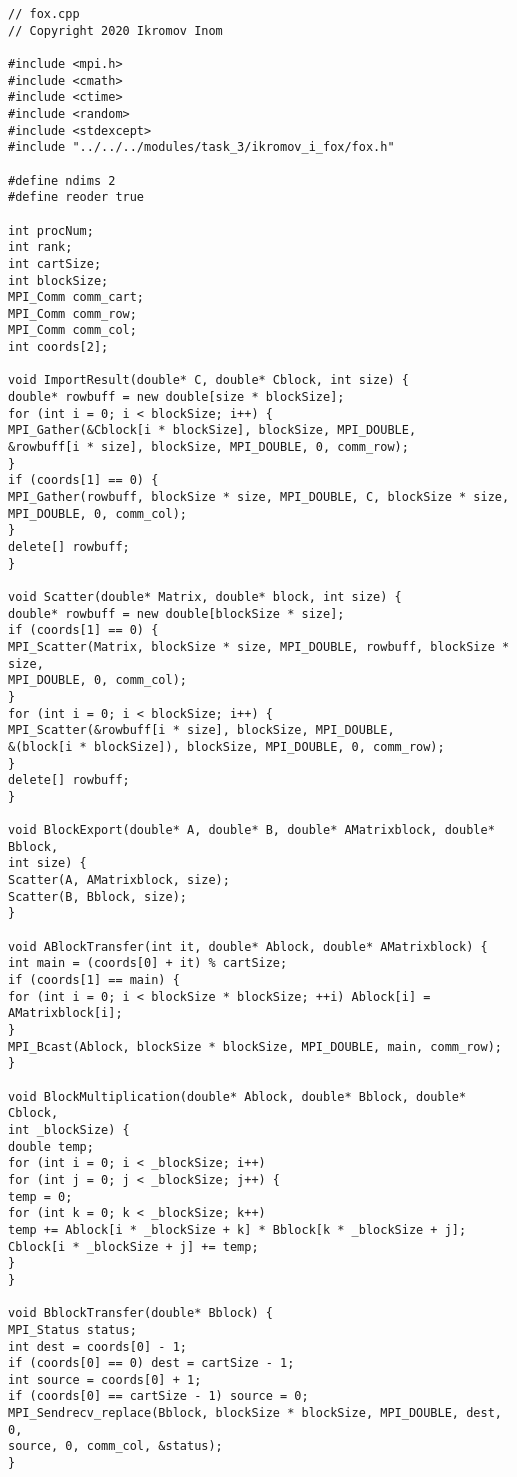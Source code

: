 \documentclass{report}
\begin{document}
\begin{lstlisting}
// fox.cpp
// Copyright 2020 Ikromov Inom

#include <mpi.h>
#include <cmath>
#include <ctime>
#include <random>
#include <stdexcept>
#include "../../../modules/task_3/ikromov_i_fox/fox.h"

#define ndims 2
#define reoder true

int procNum;
int rank;
int cartSize;
int blockSize;
MPI_Comm comm_cart;
MPI_Comm comm_row;
MPI_Comm comm_col;
int coords[2];

void ImportResult(double* C, double* Cblock, int size) {
double* rowbuff = new double[size * blockSize];
for (int i = 0; i < blockSize; i++) {
MPI_Gather(&Cblock[i * blockSize], blockSize, MPI_DOUBLE,
&rowbuff[i * size], blockSize, MPI_DOUBLE, 0, comm_row);
}
if (coords[1] == 0) {
MPI_Gather(rowbuff, blockSize * size, MPI_DOUBLE, C, blockSize * size,
MPI_DOUBLE, 0, comm_col);
}
delete[] rowbuff;
}

void Scatter(double* Matrix, double* block, int size) {
double* rowbuff = new double[blockSize * size];
if (coords[1] == 0) {
MPI_Scatter(Matrix, blockSize * size, MPI_DOUBLE, rowbuff, blockSize * size,
MPI_DOUBLE, 0, comm_col);
}
for (int i = 0; i < blockSize; i++) {
MPI_Scatter(&rowbuff[i * size], blockSize, MPI_DOUBLE,
&(block[i * blockSize]), blockSize, MPI_DOUBLE, 0, comm_row);
}
delete[] rowbuff;
}

void BlockExport(double* A, double* B, double* AMatrixblock, double* Bblock,
int size) {
Scatter(A, AMatrixblock, size);
Scatter(B, Bblock, size);
}

void ABlockTransfer(int it, double* Ablock, double* AMatrixblock) {
int main = (coords[0] + it) % cartSize;
if (coords[1] == main) {
for (int i = 0; i < blockSize * blockSize; ++i) Ablock[i] = AMatrixblock[i];
}
MPI_Bcast(Ablock, blockSize * blockSize, MPI_DOUBLE, main, comm_row);
}

void BlockMultiplication(double* Ablock, double* Bblock, double* Cblock,
int _blockSize) {
double temp;
for (int i = 0; i < _blockSize; i++)
for (int j = 0; j < _blockSize; j++) {
temp = 0;
for (int k = 0; k < _blockSize; k++)
temp += Ablock[i * _blockSize + k] * Bblock[k * _blockSize + j];
Cblock[i * _blockSize + j] += temp;
}
}

void BblockTransfer(double* Bblock) {
MPI_Status status;
int dest = coords[0] - 1;
if (coords[0] == 0) dest = cartSize - 1;
int source = coords[0] + 1;
if (coords[0] == cartSize - 1) source = 0;
MPI_Sendrecv_replace(Bblock, blockSize * blockSize, MPI_DOUBLE, dest, 0,
source, 0, comm_col, &status);
}


\end{lstlisting}
\end{document}
